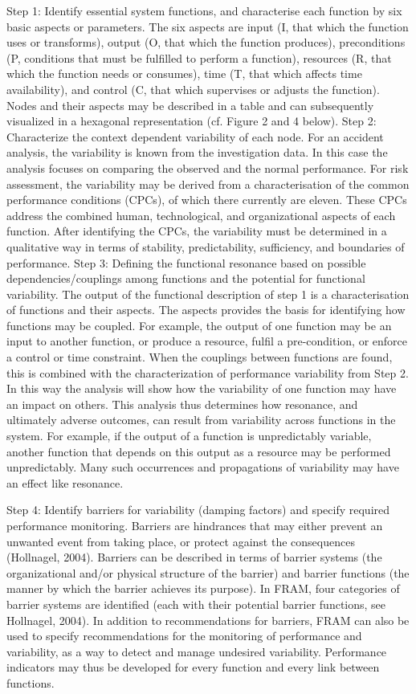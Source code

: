 Step 1: Identify essential system functions, and characterise each function by six basic aspects
or parameters. The six aspects are input (I, that which the function uses or transforms), output
(O, that which the function produces), preconditions (P, conditions that must be fulfilled to
perform a function), resources (R, that which the function needs or consumes), time (T, that
which affects time availability), and control (C, that which supervises or adjusts the function).
Nodes and their aspects may be described in a table and can subsequently visualized in a
hexagonal representation (cf. Figure 2 and 4 below).
Step 2: Characterize the context dependent variability of each node. For an accident analysis,
the variability is known from the investigation data. In this case the analysis focuses on
comparing the observed and the normal performance. For risk assessment, the variability may
be derived from a characterisation of the common performance conditions (CPCs), of which
there currently are eleven. These CPCs address the combined human, technological, and
organizational aspects of each function. After identifying the CPCs, the variability must be
determined in a qualitative way in terms of stability, predictability, sufficiency, and
boundaries of performance.
Step 3: Defining the functional resonance based on possible dependencies/couplings among
functions and the potential for functional variability. The output of the functional description
of step 1 is a characterisation of functions and their aspects. The aspects provides the basis for
identifying how functions may be coupled. For example, the output of one function may be an
input to another function, or produce a resource, fulfil a pre-condition, or enforce a control or
time constraint. When the couplings between functions are found, this is combined with the
characterization of performance variability from Step 2. In this way the analysis will show
how the variability of one function may have an impact on others. This analysis thus
determines how resonance, and ultimately adverse outcomes, can result from variability
across functions in the system. For example, if the output of a function is unpredictably
variable, another function that depends on this output as a resource may be performed
unpredictably. Many such occurrences and propagations of variability may have an effect like
resonance.

Step 4: Identify barriers for variability (damping factors) and specify required performance
monitoring. Barriers are hindrances that may either prevent an unwanted event from taking
place, or protect against the consequences (Hollnagel, 2004). Barriers can be described in
terms of barrier systems (the organizational and/or physical structure of the barrier) and
barrier functions (the manner by which the barrier achieves its purpose). In FRAM, four
categories of barrier systems are identified (each with their potential barrier functions, see
Hollnagel, 2004). In addition to recommendations for barriers, FRAM can also be used to
specify recommendations for the monitoring of performance and variability, as a way to
detect and manage undesired variability. Performance indicators may thus be developed for
every function and every link between functions.


